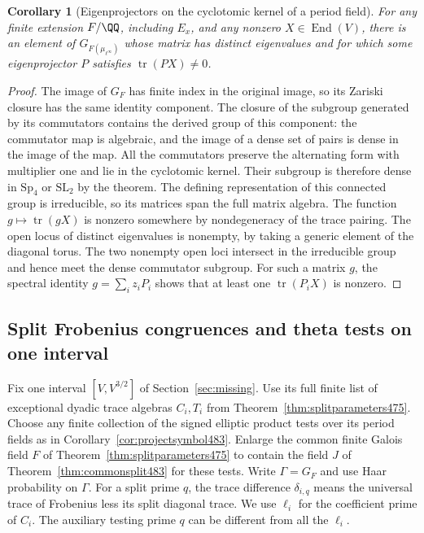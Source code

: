 \documentclass[a4paper,11pt]{article}
\newtheorem{corollary}[proposition]{Corollary}
\theoremstyle{definition}
\theoremstyle{remark}
\numberwithin{equation}{section}
\begin{document}
\begin{corollary}[Eigenprojectors on the cyclotomic kernel of a period field]\leavevmode
\label{cor:cyclomonodromy476}
For any finite extension \(F/\QQ\), including \(E_x\), and any
nonzero \(X\in\operatorname{End}(V)\), there is an element of
\(G_{F(\mu_{\ell^\infty})}\) whose matrix has distinct eigenvalues
and for which some eigenprojector \(P\) satisfies
\(\operatorname{tr}(PX)\ne0\).
\end{corollary}
\begin{proof}
The image of \(G_F\) has finite index in the original image, so
its Zariski closure has the same identity component. The closure
of the subgroup generated by its commutators contains the
derived group of this component: the commutator map is algebraic,
and the image of a dense set of pairs is dense in the image of
the map. All the commutators preserve the alternating form with
multiplier one and lie in the cyclotomic kernel. Their subgroup
is therefore dense in \(\mathrm{Sp}_4\) or \(\mathrm{SL}_2\)
by the theorem. The defining representation of this connected
group is irreducible, so its matrices span the full matrix
algebra. The function \(g\mapsto\operatorname{tr}(gX)\) is
nonzero somewhere by nondegeneracy of the trace pairing.
The open locus of distinct eigenvalues is nonempty, by taking
a generic element of the diagonal torus. The two nonempty open
loci intersect in the irreducible group and hence meet the
dense commutator subgroup. For such a matrix \(g\), the spectral
identity \(g=\sum_i z_iP_i\) shows that at least one
\(\operatorname{tr}(P_iX)\) is nonzero.
\end{proof}


\subsection{Split Frobenius congruences and theta tests on one interval}
\label{sec:jointprimes484}

Fix one interval \([V,V^{3/2}]\) of Section~\ref{sec:missing}.
Use its full finite list of exceptional dyadic trace algebras
\(C_i,T_i\) from Theorem~\ref{thm:splitparameters475}. Choose
any finite collection of the signed elliptic product tests over
its period fields as in Corollary~\ref{cor:projectsymbol483}.
Enlarge the common finite Galois field \(F\) of
Theorem~\ref{thm:splitparameters475} to contain the field \(J\)
of Theorem~\ref{thm:commonsplit483} for these tests. Write
\(\Gamma=G_F\) and use Haar probability on \(\Gamma\). For a
split prime \(q\), the trace difference \(\delta_{i,q}\) means
the universal trace of Frobenius less its split diagonal trace.
We use \(\ell_i\) for the coefficient prime of \(C_i\).
The auxiliary testing prime \(q\) can be different from all the
\(\ell_i\).
\end{document}
